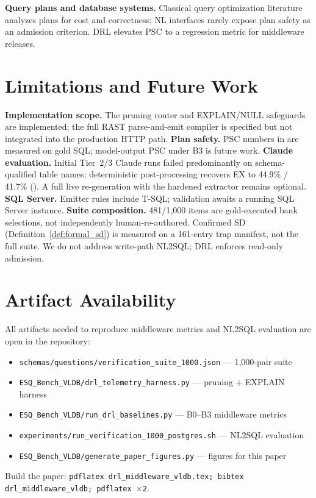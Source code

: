 \documentclass[twocolumn]{svjour3}
\begin{document}
\textbf{Query plans and database systems.}
Classical query optimization literature analyzes plans for cost and correctness; NL interfaces rarely expose plan safety as an admission criterion.
DRL elevates PSC to a regression metric for middleware releases.

\section{Limitations and Future Work}
\label{sec:limits}

\textbf{Implementation scope.} The pruning router and EXPLAIN/NULL safeguards are implemented; the full RAST parse-and-emit compiler is specified but not integrated into the production HTTP path.
\textbf{Plan safety.} PSC numbers in  are measured on gold SQL; model-output PSC under B3 is future work.
\textbf{Claude evaluation.} Initial Tier~2/3 Claude runs failed predominantly on schema-qualified table names; deterministic post-processing recovers EX to 44.9\% / 41.7\% (). A full live re-generation with the hardened extractor remains optional.
\textbf{SQL Server.} Emitter rules include T-SQL; validation awaits a running SQL Server instance.
\textbf{Suite composition.} 481/1{,}000 items are gold-executed bank selections, not independently human-re-authored.
Confirmed SD (Definition~\ref{def:formal_sd}) is measured on a 161-entry trap manifest, not the full suite.
We do not address write-path NL2SQL; DRL enforces read-only admission.

\section{Artifact Availability}
\label{sec:artifact}

All artifacts needed to reproduce middleware metrics and NL2SQL evaluation are open in the repository:
\begin{itemize}[leftmargin=*]
  \item \texttt{schemas/questions/verification\_suite\_1000.json} --- 1{,}000-pair suite
  \item \texttt{ESQ\_Bench\_VLDB/drl\_telemetry\_harness.py} --- pruning + EXPLAIN harness
  \item \texttt{ESQ\_Bench\_VLDB/run\_drl\_baselines.py} --- B0--B3 middleware metrics
  \item \texttt{experiments/run\_verification\_1000\_postgres.sh} --- NL2SQL evaluation
  \item \texttt{ESQ\_Bench\_VLDB/generate\_paper\_figures.py} --- figures for this paper
\end{itemize}
Build the paper: \texttt{pdflatex drl\_middleware\_vldb.tex; bibtex drl\_middleware\_vldb; pdflatex $\times$2}.
\end{document}
